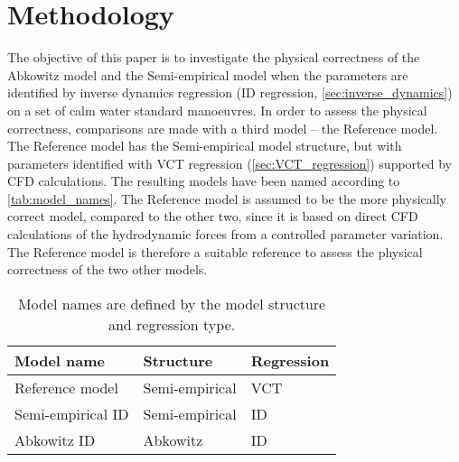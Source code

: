\section{Methodology}
\label{sec:methodology}
The objective of this paper is to investigate the physical correctness of the Abkowitz model and the Semi-empirical model when the parameters are identified by inverse dynamics regression (ID regression, \autoref{sec:inverse_dynamics}) on a set of calm water standard manoeuvres. In order to assess the physical correctness, comparisons are made with a third model -- the Reference model. The Reference model has the Semi-empirical model structure, but with parameters identified with VCT regression (\autoref{sec:VCT_regression}) supported by CFD calculations. The resulting models have been named according to \autoref{tab:model_names}.
The Reference model is assumed to be the more physically correct model, compared to the other two, since it is based on direct CFD calculations of the hydrodynamic forces from a controlled parameter variation. The Reference model is therefore a suitable reference to assess the physical correctness of the two other models.
\begin{table}[h]
    \caption{Model names are defined by the model structure and regression type.}
    \label{tab:model_names}
    \centering
    \begin{tabular}{l l l}
        Model name & Structure & Regression \\
        \hline
        Reference model & Semi-empirical & VCT \\
        Semi-empirical ID & Semi-empirical & ID \\
        Abkowitz ID & Abkowitz & ID \\
    \end{tabular}
\end{table}

\FloatBarrier
